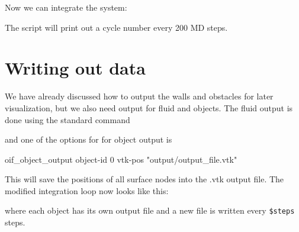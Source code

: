 \documentclass[
a4paper,                        %
11pt,                           %
twoside,                        %
footsepline,                    %
headsepline,                    %
headexclude,                    %
footexclude,                    %
pagesize,                       %
]{scrartcl}
\begin{document}
Now we can integrate the system:\\
 \vspace{0 mm}
 
The script will print out a cycle number every 200 MD steps.
 
\section{Writing out data}

We have already discussed how to output the walls and obstacles for later visualization, but we also need output for fluid and objects. The fluid output is done using the standard \es command\\ 
 \vspace{0 mm}
 
 and one of the options for for object output is\\ 
 \begin{tclcode}
  oif_object_output object-id 0 vtk-pos "output/output_file.vtk"
  \end{tclcode}
  \vspace{0 mm}
  
This will save the positions of all surface nodes into the .vtk output file. The modified integration loop now looks like this:\\
 \vspace{0 mm}
 
 where each object has its own output file and a new file is written every \verb|$steps| steps.
\end{document}
